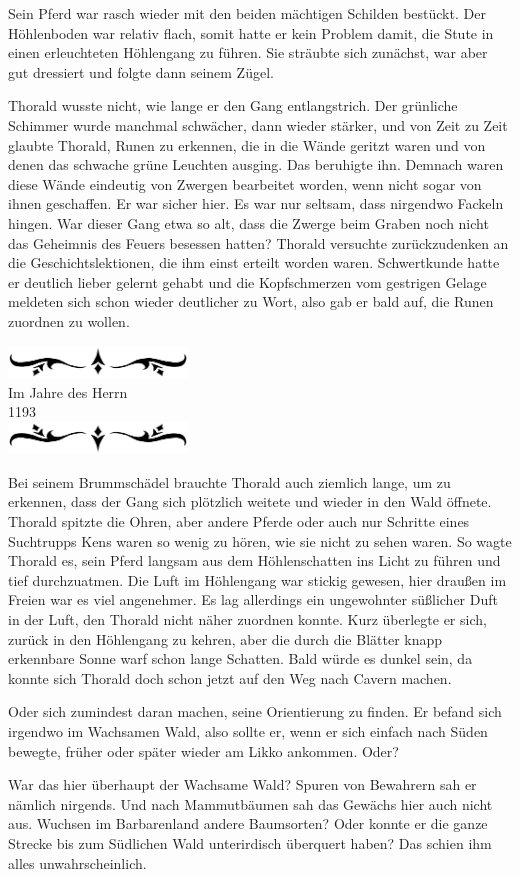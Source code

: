 \documentclass[10pt, a4paper, oneside]{book}
\newcommand{\jdh}[1]{%
    \begin{center}
        \includegraphics[width=180px]{Das Erbe des Wunderkindes/verzierung1.png}\\
        {Im Jahre des Herrn}\\
        \vspace{5pt}
        {\Huge #1} \\
        \includegraphics[width=180px]{Das Erbe des Wunderkindes/verzierung2.png}
    \end{center}
    \extramarks{}{A.D. #1}
}
\begin{document}
Sein Pferd war rasch wieder mit den beiden mächtigen Schilden bestückt. Der Höhlenboden war relativ flach, somit hatte er kein Problem damit, die Stute in einen erleuchteten Höhlengang zu führen. Sie sträubte sich zunächst, war aber gut dressiert und folgte dann seinem Zügel.

Thorald wusste nicht, wie lange er den Gang entlangstrich. Der grünliche Schimmer wurde manchmal schwächer, dann wieder stärker, und von Zeit zu Zeit glaubte Thorald, Runen zu erkennen, die in die Wände geritzt waren und von denen das schwache grüne Leuchten ausging. Das beruhigte ihn. Demnach waren diese Wände eindeutig von Zwergen bearbeitet worden, wenn nicht sogar von ihnen geschaffen. Er war sicher hier. Es war nur seltsam, dass nirgendwo Fackeln hingen. War dieser Gang etwa so alt, dass die Zwerge beim Graben noch nicht das Geheimnis des Feuers besessen hatten? Thorald versuchte zurückzudenken an die Geschichtslektionen, die ihm einst erteilt worden waren. Schwertkunde hatte er deutlich lieber gelernt gehabt und die Kopfschmerzen vom gestrigen Gelage meldeten sich schon wieder deutlicher zu Wort, also gab er bald auf, die Runen zuordnen zu wollen.

\jdh{1193}

Bei seinem Brummschädel brauchte Thorald auch ziemlich lange, um zu erkennen, dass der Gang sich plötzlich weitete und wieder in den Wald öffnete. Thorald spitzte die Ohren, aber andere Pferde oder auch nur Schritte eines Suchtrupps Kens waren so wenig zu hören, wie sie nicht zu sehen waren. So wagte Thorald es, sein Pferd langsam aus dem Höhlenschatten ins Licht zu führen und tief durchzuatmen. Die Luft im Höhlengang war stickig gewesen, hier draußen im Freien war es viel angenehmer. Es lag allerdings ein ungewohnter süßlicher Duft in der Luft, den Thorald nicht näher zuordnen konnte. Kurz überlegte er sich, zurück in den Höhlengang zu kehren, aber die durch die Blätter knapp erkennbare Sonne warf schon lange Schatten. Bald würde es dunkel sein, da konnte sich Thorald doch schon jetzt auf den Weg nach Cavern machen.

Oder sich zumindest daran machen, seine Orientierung zu finden. Er befand sich irgendwo im Wachsamen Wald, also sollte er, wenn er sich einfach nach Süden bewegte, früher oder später wieder am Likko ankommen. Oder?

War das hier überhaupt der Wachsame Wald? Spuren von Bewahrern sah er nämlich nirgends. Und nach Mammutbäumen sah das Gewächs hier auch nicht aus. Wuchsen im Barbarenland andere Baumsorten? Oder konnte er die ganze Strecke bis zum Südlichen Wald unterirdisch überquert haben? Das schien ihm alles unwahrscheinlich.
\end{document}
